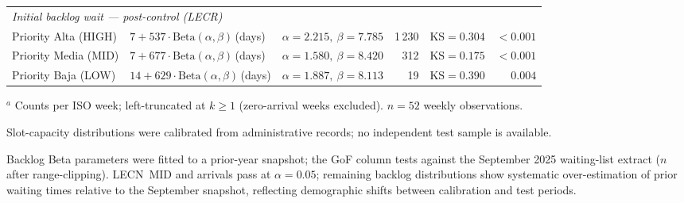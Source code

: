 \begin{table}[htbp]
\begin{tabularx}{\textwidth}{l l l r r r}
\multicolumn{6}{l}{\textit{Initial backlog wait — post-control (LECR)}} \\[2pt]
Priority Alta (HIGH) & $7 + 537\cdot\mathrm{Beta}(\alpha,\beta)$\,(days) & $\alpha{=}2.215,\ \beta{=}7.785$ & 1\,230 & $\mathrm{KS}{=}0.304$ & ${<}0.001$ \\
Priority Media (MID) & $7 + 677\cdot\mathrm{Beta}(\alpha,\beta)$\,(days) & $\alpha{=}1.580,\ \beta{=}8.420$ & 312 & $\mathrm{KS}{=}0.175$ & ${<}0.001$ \\
Priority Baja (LOW) & $14 + 629\cdot\mathrm{Beta}(\alpha,\beta)$\,(days) & $\alpha{=}1.887,\ \beta{=}8.113$ & 19 & $\mathrm{KS}{=}0.390$ & $0.004$ \\
\bottomrule
\end{tabularx}
\begin{tablenotes}
\small
\item $^a$ Counts per ISO week; left-truncated at $k\!\ge\!1$ (zero-arrival weeks excluded). $n{=}52$ weekly observations.
\item Slot-capacity distributions were calibrated from administrative records; no independent test sample is available.
\item Backlog Beta parameters were fitted to a prior-year snapshot; the GoF column tests against the
      September 2025 waiting-list extract ($n$ after range-clipping). LECN~MID and arrivals pass at
      $\alpha{=}0.05$; remaining backlog distributions show systematic over-estimation of prior waiting
      times relative to the September snapshot, reflecting demographic shifts between calibration
      and test periods.
\end{tablenotes}
\end{table}
